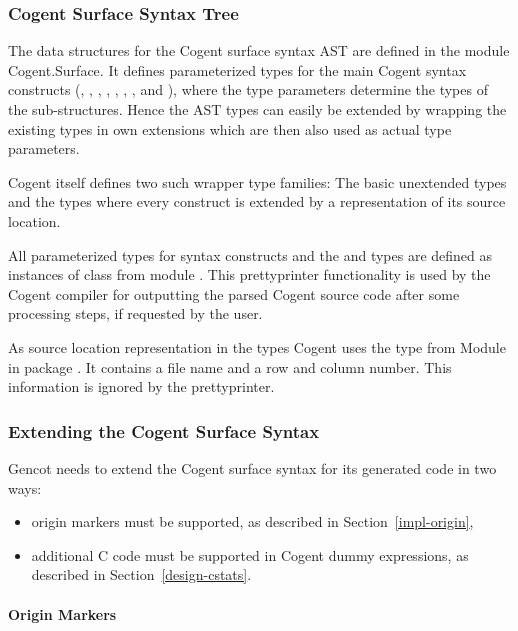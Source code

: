 \subsubsection{Cogent Surface Syntax Tree}

The data structures for the Cogent surface syntax AST are defined in the module Cogent.Surface. It defines parameterized types
for the main Cogent syntax constructs (, , , , , 
, , and ), where the type parameters determine the types of the 
sub-structures. Hence the AST types
can easily be extended by wrapping the existing types in own extensions which are then also used as actual type parameters.

Cogent itself defines two such wrapper type families: The basic unextended types  and the types 
where every construct is extended by a representation of its source location. 

All parameterized types for syntax constructs and the  and  types are defined as instances of 
class  from
module . This prettyprinter functionality is used by the Cogent compiler for outputting
the parsed Cogent source code after some processing steps, if requested by the user.

As source location representation in the  types Cogent uses the type  from Module 
 in package .
It contains a file name and a row and column number. This information is ignored by the prettyprinter.

\subsubsection{Extending the Cogent Surface Syntax}

Gencot needs to extend the Cogent surface syntax for its generated code in two ways:
\begin{itemize}
\item origin markers must be supported, as described in Section~\ref{impl-origin},
\item additional C code must be supported in Cogent dummy expressions, as described in Section~\ref{design-cstats}.
\end{itemize}

\paragraph{Origin Markers}

